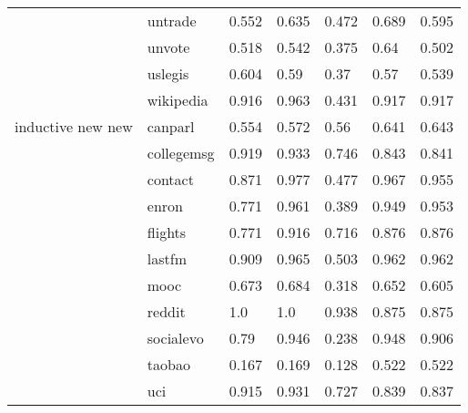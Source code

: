 \begin{tabular}{lllllll}
             & untrade &          0.552 &                 0.635 &                     0.472 &         0.689 &                    0.595 \\
             & unvote &          0.518 &                 0.542 &                     0.375 &          0.64 &                    0.502 \\
             & uslegis &          0.604 &                  0.59 &                      0.37 &          0.57 &                    0.539 \\
             & wikipedia &          0.916 &                 0.963 &                     0.431 &         0.917 &                    0.917 \\
inductive new new & canparl &          0.554 &                 0.572 &                      0.56 &         0.641 &                    0.643 \\
             & collegemsg &          0.919 &                 0.933 &                     0.746 &         0.843 &                    0.841 \\
             & contact &          0.871 &                 0.977 &                     0.477 &         0.967 &                    0.955 \\
             & enron &          0.771 &                 0.961 &                     0.389 &         0.949 &                    0.953 \\
             & flights &          0.771 &                 0.916 &                     0.716 &         0.876 &                    0.876 \\
             & lastfm &          0.909 &                 0.965 &                     0.503 &         0.962 &                    0.962 \\
             & mooc &          0.673 &                 0.684 &                     0.318 &         0.652 &                    0.605 \\
             & reddit &            1.0 &                   1.0 &                     0.938 &         0.875 &                    0.875 \\
             & socialevo &           0.79 &                 0.946 &                     0.238 &         0.948 &                    0.906 \\
             & taobao &          0.167 &                 0.169 &                     0.128 &         0.522 &                    0.522 \\
             & uci &          0.915 &                 0.931 &                     0.727 &         0.839 &                    0.837 \\

\end{tabular}
